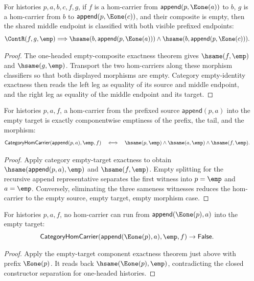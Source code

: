 \begin{theorem}
\label{thm:functor-prefix-hom-carrier-e1-endpoint-empty-composite-middle-hsame}
For histories $p,a,b,c,f,g$, if $f$ is a hom-carrier from
$\mathsf{append}(p,\Eone(a))$ to $b$, $g$ is a hom-carrier from $b$ to
$\mathsf{append}(p,\Eone(c))$, and their composite is empty, then the shared
middle endpoint is classified with both visible prefixed endpoints:
$$
\ContR(f,g,\emp)
\Longrightarrow
\hsame(b,\mathsf{append}(p,\Eone(a)))\wedge
\hsame(b,\mathsf{append}(p,\Eone(c))).
$$
\end{theorem}
\begin{proof}
The one-headed empty-composite exactness theorem gives
$\hsame(f,\emp)$ and $\hsame(g,\emp)$. Transport the two hom-carriers along
these morphism classifiers so that both displayed morphisms are empty. Category
empty-identity exactness then reads the left leg as equality of its source and
middle endpoint, and the right leg as equality of the middle endpoint and its
target.
\end{proof}

\begin{theorem}
\label{thm:functor-prefix-hom-carrier-empty-target-components-iff}
For histories $p,a,f$, a hom-carrier from the prefixed source
$\mathsf{append}(p,a)$ into the empty target is exactly componentwise emptiness
of the prefix, the tail, and the morphism:
$$
\mathsf{CategoryHomCarrier}(\mathsf{append}(p,a),\emp,f)
\quad\Longleftrightarrow\quad
\hsame(p,\emp)\wedge\hsame(a,\emp)\wedge\hsame(f,\emp).
$$
\end{theorem}
\begin{proof}
Apply category empty-target exactness to obtain
$\hsame(\mathsf{append}(p,a),\emp)$ and $\hsame(f,\emp)$. Empty splitting for
the recursive append representative separates the first witness into
$p=\emp$ and $a=\emp$. Conversely, eliminating the three sameness witnesses
reduces the hom-carrier to the empty source, empty target, empty morphism
case.
\end{proof}

\begin{theorem}
\label{thm:functor-prefix-hom-carrier-e1-prefix-empty-target-absurd}
For histories $p,a,f$, no hom-carrier can run from
$\mathsf{append}(\Eone(p),a)$ into the empty target:
$$
\mathsf{CategoryHomCarrier}(\mathsf{append}(\Eone(p),a),\emp,f)
\to \mathsf{False}.
$$
\end{theorem}
\begin{proof}
Apply the empty-target component exactness theorem just above with prefix
$\Eone(p)$. It reads back $\hsame(\Eone(p),\emp)$, contradicting the closed
constructor separation for one-headed histories.
\end{proof}

